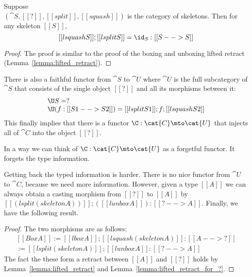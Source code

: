 \begin{lemma}
  \label{lemma:lifted_retract_for_?}
  Suppose \\$(\cat{S}, [[?]], [[split]],[[squash]])$ is the category of
  skeletons.  Then for any skeleton $[[S]]$,
  \[
    [[lsquash S]];[[lsplit S]] = \id_S : [[S --> S]]
  \]
\end{lemma}
\begin{proof}
  The proof is similar to the proof of the boxing and unboxing lifted
  retract (Lemma~\ref{lemma:lifted_retract}).
\end{proof}
There is also a faithful functor from $\cat{S}$ to $\cat{U}$ where
$\cat{U}$ is the full subcategory of $\cat{S}$ that consists of the
single object $[[?]]$ and all its morphisms between it:
\[
\begin{array}{lll}
  \U S = ?\\
  \U (f : [[S1 --> S2]]) = [[lsplit S1]];f;[[lsquash S2]]
\end{array}
\]
This finally implies that there is a functor $\C : \cat{C} \mto
\cat{U}$ that injects all of $\cat{C}$ into the object $[[?]]$.
\noindent
In a way we can think of $\C :  \mto {}$ as a forgetful
functor.  It forgets the type information.

Getting back the typed information is harder.  There is no nice
functor from $$ to $$, because we need more information.
However, given a type $[[A]]$ we can always obtain a casting morphism
from $[[?]]$ to $[[A]]$ by $[[(lsplit (skeleton A))]];([[lunbox A]]) :
[[? --> A]]$.  Finally, we have the following result.
\begin{proof}
  The two morphisms are as follows:
  \[
  \begin{array}{lll}
    [[Box A]] := [[lbox A]];[[lsquash (skeleton A)]] : [[A --> ?]]\\
    [[Unbox A]] := [[lsplit (skeleton A)]];[[lunbox A]] : [[? --> A]]
  \end{array}
  \]
  \noindent
  The fact the these form a retract between $[[A]]$ and $[[?]]$ holds
  by Lemma~\ref{lemma:lifted_retract} and
  Lemma~\ref{lemma:lifted_retract_for_?}.
\end{proof}

